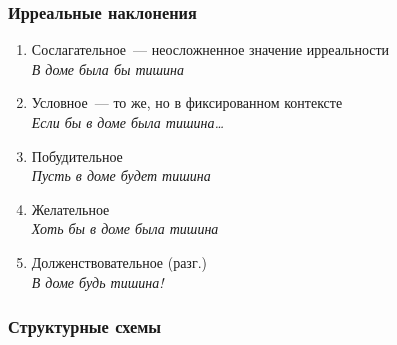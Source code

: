 \begin{frame}
  \frametitle{Ирреальные наклонения}

  \begin{enumerate}
    \item Сослагательное~--- неосложненное значение ирреальности \\
      \textit{В доме была бы тишина}
    \item Условное~--- то же, но в фиксированном контексте \\
      \textit{Если бы в доме была тишина\ldots}
    \item Побудительное \\
      \textit{Пусть в доме будет тишина}
    \item Желательное \\
      \textit{Хоть бы в доме была тишина}
    \item Долженствовательное (разг.) \\
      \textit{В доме будь тишина!}
  \end{enumerate}
\end{frame}

\begin{frame}
  \frametitle{Структурные схемы}
\end{frame}
